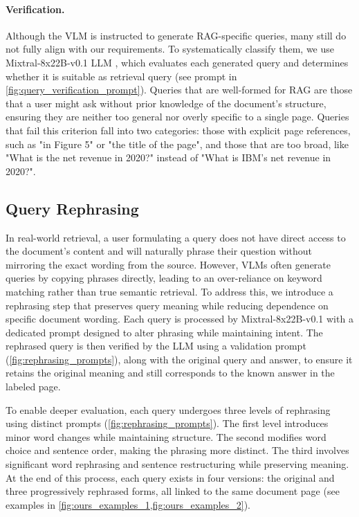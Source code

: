 \paragraph{Verification.}
Although the VLM is instructed to generate RAG-specific queries, many still do not fully align with our requirements. To systematically classify them, we use Mixtral-8x22B-v0.1 LLM \citep{jiang2024mixtral}, which evaluates each generated query and determines whether it is suitable as retrieval query  (see prompt in \cref{fig:query_verification_prompt}).
Queries that are well-formed for RAG are those that a user might ask without prior knowledge of the document’s structure, ensuring they are neither too general nor overly specific to a single page. Queries that fail this criterion fall into two categories: those with explicit page references, such as "in Figure 5" or "the title of the page", and those that are too broad, like "What is the net revenue in 2020?" instead of "What is IBM’s net revenue in 2020?". 





\subsection{Query Rephrasing}
In real-world retrieval, a user formulating a query does not have direct access to the document’s content and will naturally phrase their question without mirroring the exact wording from the source. However, VLMs often generate queries by copying phrases directly, leading to an over-reliance on keyword matching rather than true semantic retrieval. To address this, we introduce a rephrasing step that preserves query meaning while reducing dependence on specific document wording.  Each query is processed by Mixtral-8x22B-v0.1 with a dedicated prompt designed to alter phrasing while maintaining intent.  
The rephrased query is then verified by the LLM using a validation prompt (\cref{fig:rephrasing_prompts}), along with the original query and answer, to ensure it retains the original meaning and still corresponds to the known answer in the labeled page.  

\vspace{0.1cm}
\noindent
To enable deeper evaluation, each query undergoes three levels of rephrasing using distinct prompts (\cref{fig:rephrasing_prompts}). The first level introduces minor word changes while maintaining structure. The second modifies word choice and sentence order, making the phrasing more distinct. The third involves significant word rephrasing and sentence restructuring while preserving meaning. At the end of this process, each query exists in four versions: the original and three progressively rephrased forms, all linked to the same document page (see examples in \cref{fig:ours_examples_1,fig:ours_examples_2}).

